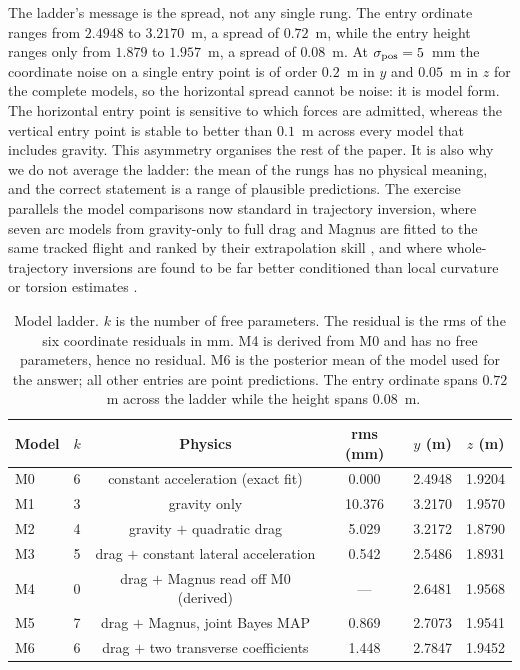 The ladder's message is the spread, not any single rung. The entry ordinate ranges
from $2.4948$ to $3.2170$~m, a spread of $0.72$~m, while the entry height ranges
only from $1.879$ to $1.957$~m, a spread of $0.08$~m. At $\sigma_{\rm pos}=5$~mm
the coordinate noise on a single entry point is of order $0.2$~m in $y$ and
$0.05$~m in $z$ for the complete models, so the horizontal spread cannot be noise:
it is model form. The horizontal entry point is sensitive to which forces are
admitted, whereas the vertical entry point is stable to better than $0.1$~m
across every model that includes gravity. This asymmetry organises the rest of
the paper. It is also why we do not average the ladder: the mean of the rungs has
no physical meaning, and the correct statement is a range of plausible
predictions. The exercise parallels the model comparisons now standard in
trajectory inversion, where seven arc models from gravity-only to full drag and
Magnus are fitted to the same tracked flight and ranked by their extrapolation
skill \citep{grad2026}, and where whole-trajectory inversions are found to be far
better conditioned than local curvature or torsion estimates
\citep{jsme2014}.

\begin{table}[t]
  \centering
  \caption{Model ladder. $k$ is the number of free parameters. The residual is the
  rms of the six coordinate residuals in mm. M4 is derived from M0 and has no free
  parameters, hence no residual. M6 is the posterior mean of the model used for the
  answer; all other entries are point predictions. The entry ordinate spans
  $0.72$~m across the ladder while the height spans $0.08$~m.}
  \label{tab:ladder}
  \small
  \begin{tabular}{@{}llcccc@{}}
    \toprule
    Model & $k$ & Physics & rms (mm) & $y$ (m) & $z$ (m) \\
    \midrule
    M0 & 6 & constant acceleration (exact fit) & 0.000 & 2.4948 & 1.9204 \\
    M1 & 3 & gravity only & 10.376 & 3.2170 & 1.9570 \\
    M2 & 4 & gravity $+$ quadratic drag & 5.029 & 3.2172 & 1.8790 \\
    M3 & 5 & drag $+$ constant lateral acceleration & 0.542 & 2.5486 & 1.8931 \\
    M4 & 0 & drag $+$ Magnus read off M0 (derived) & --- & 2.6481 & 1.9568 \\
    M5 & 7 & drag $+$ Magnus, joint Bayes MAP & 0.869 & 2.7073 & 1.9541 \\
    M6 & 6 & drag $+$ two transverse coefficients & 1.448 & 2.7847 & 1.9452 \\
    \bottomrule
  \end{tabular}
\end{table}

